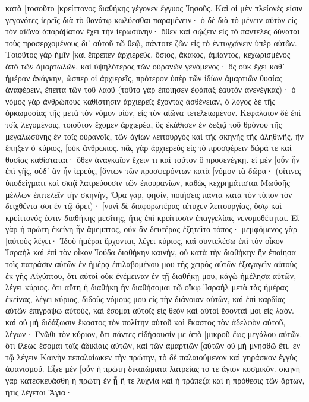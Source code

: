 κατὰ [τοσοῦτο [κρείττονος διαθήκης γέγονεν ἔγγυος Ἰησοῦς. 
Καὶ οἱ μὲν πλείονές εἰσιν γεγονότες ἱερεῖς διὰ τὸ θανάτῳ κωλύεσθαι παραμένειν· 
ὁ δὲ διὰ τὸ μένειν αὐτὸν εἰς τὸν αἰῶνα ἀπαράβατον ἔχει τὴν ἱερωσύνην· 
ὅθεν καὶ σῴζειν εἰς τὸ παντελὲς δύναται τοὺς προσερχομένους δι᾽ αὐτοῦ τῷ θεῷ, πάντοτε ζῶν εἰς τὸ ἐντυγχάνειν ὑπὲρ αὐτῶν. 
Τοιοῦτος γὰρ ἡμῖν [καὶ ἔπρεπεν ἀρχιερεύς, ὅσιος, ἄκακος, ἀμίαντος, κεχωρισμένος ἀπὸ τῶν ἁμαρτωλῶν, καὶ ὑψηλότερος τῶν οὐρανῶν γενόμενος· 
ὃς οὐκ ἔχει καθ᾽ ἡμέραν ἀνάγκην, ὥσπερ οἱ ἀρχιερεῖς, πρότερον ὑπὲρ τῶν ἰδίων ἁμαρτιῶν θυσίας ἀναφέρειν, ἔπειτα τῶν τοῦ λαοῦ (τοῦτο γὰρ ἐποίησεν ἐφάπαξ ἑαυτὸν ἀνενέγκας)· 
ὁ νόμος γὰρ ἀνθρώπους καθίστησιν ἀρχιερεῖς ἔχοντας ἀσθένειαν, ὁ λόγος δὲ τῆς ὁρκωμοσίας τῆς μετὰ τὸν νόμον υἱόν, εἰς τὸν αἰῶνα τετελειωμένον. 
Κεφάλαιον δὲ ἐπὶ τοῖς λεγομένοις, τοιοῦτον ἔχομεν ἀρχιερέα, ὃς ἐκάθισεν ἐν δεξιᾷ τοῦ θρόνου τῆς μεγαλωσύνης ἐν τοῖς οὐρανοῖς, 
τῶν ἁγίων λειτουργὸς καὶ τῆς σκηνῆς τῆς ἀληθινῆς, ἣν ἔπηξεν ὁ κύριος, [οὐκ ἄνθρωπος. 
πᾶς γὰρ ἀρχιερεὺς εἰς τὸ προσφέρειν δῶρά τε καὶ θυσίας καθίσταται· ὅθεν ἀναγκαῖον ἔχειν τι καὶ τοῦτον ὃ προσενέγκῃ. 
εἰ μὲν [οὖν ἦν ἐπὶ γῆς, οὐδ᾽ ἂν ἦν ἱερεύς, [ὄντων τῶν προσφερόντων κατὰ [νόμον τὰ δῶρα· 
(οἵτινες ὑποδείγματι καὶ σκιᾷ λατρεύουσιν τῶν ἐπουρανίων, καθὼς κεχρημάτισται Μωϋσῆς μέλλων ἐπιτελεῖν τὴν σκηνήν, Ὅρα γάρ, φησίν, ποιήσεις πάντα κατὰ τὸν τύπον τὸν δειχθέντα σοι ἐν τῷ ὄρει)· 
[νυνὶ δὲ διαφορωτέρας τέτυχεν λειτουργίας, ὅσῳ καὶ κρείττονός ἐστιν διαθήκης μεσίτης, ἥτις ἐπὶ κρείττοσιν ἐπαγγελίαις νενομοθέτηται. 
Εἰ γὰρ ἡ πρώτη ἐκείνη ἦν ἄμεμπτος, οὐκ ἂν δευτέρας ἐζητεῖτο τόπος· 
μεμφόμενος γὰρ [αὐτοὺς λέγει· Ἰδοὺ ἡμέραι ἔρχονται, λέγει κύριος, καὶ συντελέσω ἐπὶ τὸν οἶκον Ἰσραὴλ καὶ ἐπὶ τὸν οἶκον Ἰούδα διαθήκην καινήν, 
οὐ κατὰ τὴν διαθήκην ἣν ἐποίησα τοῖς πατράσιν αὐτῶν ἐν ἡμέρᾳ ἐπιλαβομένου μου τῆς χειρὸς αὐτῶν ἐξαγαγεῖν αὐτοὺς ἐκ γῆς Αἰγύπτου, ὅτι αὐτοὶ οὐκ ἐνέμειναν ἐν τῇ διαθήκῃ μου, κἀγὼ ἠμέλησα αὐτῶν, λέγει κύριος. 
ὅτι αὕτη ἡ διαθήκη ἣν διαθήσομαι τῷ οἴκῳ Ἰσραὴλ μετὰ τὰς ἡμέρας ἐκείνας, λέγει κύριος, διδοὺς νόμους μου εἰς τὴν διάνοιαν αὐτῶν, καὶ ἐπὶ καρδίας αὐτῶν ἐπιγράψω αὐτούς, καὶ ἔσομαι αὐτοῖς εἰς θεόν καὶ αὐτοὶ ἔσονταί μοι εἰς λαόν. 
καὶ οὐ μὴ διδάξωσιν ἕκαστος τὸν πολίτην αὐτοῦ καὶ ἕκαστος τὸν ἀδελφὸν αὐτοῦ, λέγων· Γνῶθι τὸν κύριον, ὅτι πάντες εἰδήσουσίν με ἀπὸ [μικροῦ ἕως μεγάλου αὐτῶν. 
ὅτι ἵλεως ἔσομαι ταῖς ἀδικίαις αὐτῶν, καὶ τῶν ἁμαρτιῶν [αὐτῶν οὐ μὴ μνησθῶ ἔτι. 
ἐν τῷ λέγειν Καινὴν πεπαλαίωκεν τὴν πρώτην, τὸ δὲ παλαιούμενον καὶ γηράσκον ἐγγὺς ἀφανισμοῦ. 
Εἶχε μὲν [οὖν ἡ πρώτη δικαιώματα λατρείας τό τε ἅγιον κοσμικόν. 
σκηνὴ γὰρ κατεσκευάσθη ἡ πρώτη ἐν ᾗ ἥ τε λυχνία καὶ ἡ τράπεζα καὶ ἡ πρόθεσις τῶν ἄρτων, ἥτις λέγεται Ἅγια· 
